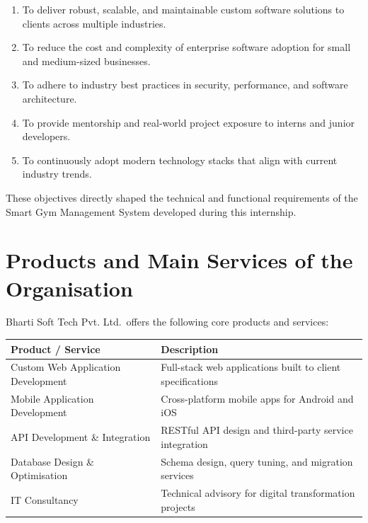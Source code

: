 \documentclass[
  12pt,
  a4paperpaper,
]{report}
\providecommand{\tightlist}{%
  \setlength{\itemsep}{0pt}\setlength{\parskip}{0pt}}
\begin{document}
\begin{enumerate}
\def\labelenumi{\arabic{enumi}.}
\tightlist
\item
  To deliver robust, scalable, and maintainable custom software
  solutions to clients across multiple industries.
\item
  To reduce the cost and complexity of enterprise software adoption for
  small and medium-sized businesses.
\item
  To adhere to industry best practices in security, performance, and
  software architecture.
\item
  To provide mentorship and real-world project exposure to interns and
  junior developers.
\item
  To continuously adopt modern technology stacks that align with current
  industry trends.
\end{enumerate}

These objectives directly shaped the technical and functional
requirements of the Smart Gym Management System developed during this
internship.


\section{Products and Main Services of the
Organisation}\label{products-and-main-services-of-the-organisation}

Bharti Soft Tech Pvt. Ltd.~offers the following core products and
services:

\noindent\begin{tabularx}{\textwidth}{|p{5.2cm}|X|}
\hline
\textbf{Product / Service} & \textbf{Description} \\
\hline

Custom Web Application Development & Full-stack web applications built to client specifications \\[4pt]
\hline
Mobile Application Development & Cross-platform mobile apps for Android and iOS \\[4pt]
\hline
API Development \& Integration & RESTful API design and third-party service integration \\[4pt]
\hline
Database Design \& Optimisation & Schema design, query tuning, and migration services \\[4pt]
\hline
IT Consultancy & Technical advisory for digital transformation projects \\
\hline
\end{tabularx}
\end{document}
